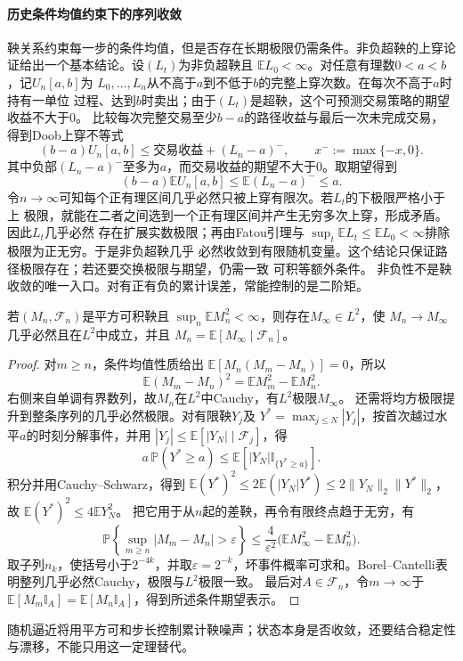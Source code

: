 \paragraph{历史条件均值约束下的序列收敛}
鞅关系约束每一步的条件均值，但是否存在长期极限仍需条件。非负超鞅的上穿论证给出一个基本结论。设$(L_t)$为非负超鞅且
$\mathbb{E}L_0<\infty$。对任意有理数$0<a<b$，记$U_n[a,b]$为
$L_0,\ldots,L_n$从不高于$a$到不低于$b$的完整上穿次数。在每次不高于$a$时持有一单位
过程、达到$b$时卖出；由于$(L_t)$是超鞅，这个可预测交易策略的期望收益不大于$0$。
比较每次完整交易至少$b-a$的路径收益与最后一次未完成交易，得到Doob上穿不等式
\[
  (b-a)U_n[a,b]
  \leq
  \text{交易收益}+(L_n-a)^-,
  \qquad x^-:=\max\{-x,0\}.
\]
其中负部$(L_n-a)^-$至多为$a$，而交易收益的期望不大于$0$。取期望得到
\[
  (b-a)\mathbb{E}U_n[a,b]
  \leq
  \mathbb{E}(L_n-a)^-
  \leq
  a.
\]
令$n\to\infty$可知每个正有理区间几乎必然只被上穿有限次。若$L_t$的下极限严格小于上
极限，就能在二者之间选到一个正有理区间并产生无穷多次上穿，形成矛盾。因此$L_t$几乎必然
存在扩展实数极限；再由Fatou引理与
$\sup_t\mathbb{E}L_t\leq\mathbb{E}L_0<\infty$排除极限为正无穷。于是非负超鞅几乎
必然收敛到有限随机变量。这个结论只保证路径极限存在；若还要交换极限与期望，仍需一致
可积等额外条件。
非负性不是鞅收敛的唯一入口。对有正有负的累计误差，常能控制的是二阶矩。
\begin{theorem}[二阶矩有界鞅的收敛]
\label{thm:rv-l2-martingale-convergence}
若\((M_n,\mathcal F_n)\)是平方可积鞅且
\(\sup_n\mathbb E M_n^2<\infty\)，则存在\(M_\infty\in L^2\)，使
\(M_n\to M_\infty\)几乎必然且在\(L^2\)中成立，并且
\(M_n=\mathbb E[M_\infty\mid\mathcal F_n]\)。
\end{theorem}
\begin{proof}
对\(m\geq n\)，条件均值性质给出
\(\mathbb E[M_n(M_m-M_n)]=0\)，所以
\[
\mathbb E(M_m-M_n)^2=\mathbb EM_m^2-\mathbb EM_n^2.
\]
右侧来自单调有界数列，故\(M_n\)在\(L^2\)中Cauchy，有\(L^2\)极限\(M_\infty\)。
还需将均方极限提升到整条序列的几乎必然极限。对有限鞅\(Y_j\)及
\(Y^*=\max_{j\leq N}|Y_j|\)，按首次越过水平\(a\)的时刻分解事件，并用
\(|Y_j|\leq\mathbb E[|Y_N|\mid\mathcal F_j]\)，得
\[
a\,\mathbb P(Y^*\geq a)
\leq\mathbb E[|Y_N|\mathbb I_{\{Y^*\geq a\}}].
\]
积分并用Cauchy--Schwarz，得到
\(\mathbb E(Y^*)^2\leq2\mathbb E(|Y_N|Y^*)\leq
2\|Y_N\|_2\|Y^*\|_2\)，故
\(\mathbb E(Y^*)^2\leq4\mathbb E Y_N^2\)。
把它用于从\(n\)起的差鞅，再令有限终点趋于无穷，有
\[
\mathbb P\left\{\sup_{m\geq n}|M_m-M_n|>\varepsilon\right\}
\leq\frac4{\varepsilon^2}
\bigl(\mathbb EM_\infty^2-\mathbb EM_n^2\bigr).
\]
取子列\(n_k\)，使括号小于\(2^{-4k}\)，并取\(\varepsilon=2^{-k}\)，坏事件概率可求和。Borel--Cantelli表明整列几乎必然Cauchy，极限与\(L^2\)极限一致。
最后对\(A\in\mathcal F_n\)，令\(m\to\infty\)于
\(\mathbb E[M_m\mathbb I_A]=\mathbb E[M_n\mathbb I_A]\)，得到所述条件期望表示。
\end{proof}
随机逼近将用平方可和步长控制累计鞅噪声；状态本身是否收敛，还要结合稳定性与漂移，不能只用这一定理替代。

